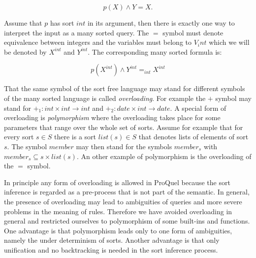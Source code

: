 \begin{displaymath}
p(X) \wedge Y=X.
\end{displaymath}

Assume that $p$ has sort $int$ in its argument, then there is exactly one way to interpret the 
input as a many sorted  query. The $=$ symbol must denote equivalence between integers and the
variables must belong to $V_int$ which we will be denoted by $X^{int}$ and $Y^{int}$. The 
corresponding many sorted formula is:

\begin{displaymath}
p(X^{int}) \wedge Y^{int} =_{int} X^{int}
\end{displaymath}

That the same symbol of the sort free language may stand for different symbols of the many sorted
language is called {\em overloading}. For example the $+$ symbol may stand for $+_1:int \times int 
\rightarrow int$ and $+_2:date \times int \rightarrow date$. A special form of overloading is 
{\em polymorphism} where the overloading takes place for some parameters that range over the whole 
set of sorts. Assume for example that for every sort $s \in S$ there is a sort $list(s) \in S$ 
that denotes lists of elements of sort $s$. The symbol $member$ may then stand for the symbols 
$member_s$ with $member_s \subseteq s \times list(s)$. An other example of polymorphism is the 
overloading of the $=$ symbol.

In principle any form of overloading is allowed in ProQuel because the sort inference is regarded 
as a pre-process that is not part of the semantic. In general, the presence of overloading may lead
to ambiguities of queries and more severe problems in the meaning of rules. Therefore we have
avoided overloading in general and restricted ourselves to polymorphism of some built-ins and
functions. One advantage is that polymorphism leads only to one form of ambiguities, namely the 
under determinism of sorts. Another advantage is that only unification and no backtracking is 
needed in the sort inference process.

